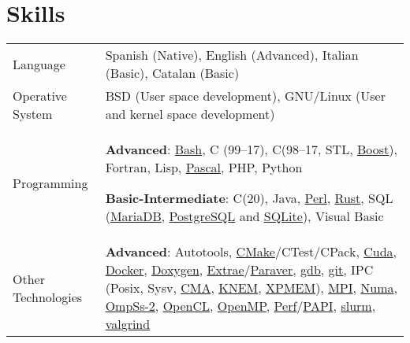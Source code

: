\documentclass[a4paper,11pt]{article}
\def\CC{{C\nolinebreak[4]\hspace{-.05em}\raisebox{.2ex}{++}}}
\begin{document}
\section{Skills}
\begin{tabularx}{\linewidth}{@{}l X@{}}
  Language & Spanish (Native), English (Advanced), Italian (Basic), Catalan (Basic)\\
  Operative System & BSD (User space development), GNU/Linux (User and kernel space development) \\
  Programming & \textbf{Advanced}: \href{https://www.gnu.org/software/bash/}{Bash},
                C (99--17), \CC (98--17, STL, \href{https://www.boost.org/}{Boost}), Fortran, Lisp,
                \href{https://www.freepascal.org/}{Pascal}, PHP, Python

                \textbf{Basic-Intermediate}: \CC (20), Java,
                \href{https://www.perl.org/}{Perl},
                \href{https://www.rust-lang.org/}{Rust},
                SQL (\href{https://mariadb.org/}{MariaDB},
                \href{https://www.postgresql.org/}{PostgreSQL} and
                \href{https://www.sqlite.org/index.html}{SQLite}), Visual Basic  \\

  Other Technologies & \textbf{Advanced}:
                       Autotools,
                       \href{https://cmake.org/}{CMake}/CTest/CPack,
                       \href{https://developer.nvidia.com/cuda-zone}{Cuda},
                       \href{https://www.docker.com/}{Docker},
                       \href{https://doxygen.nl/}{Doxygen},
                       \href{https://tools.bsc.es/extrae}{Extrae}/\href{https://tools.bsc.es/paraver}{Paraver},
                       \href{https://www.sourceware.org/gdb/}{gdb},
                       \href{https://git-scm.com/}{git},
                       IPC (Posix, Sysv,
                       \href{https://lwn.net/Articles/405284/}{CMA},
                       \href{https://knem.gitlabpages.inria.fr/}{KNEM},
                       \href{https://github.com/hpc/xpmem}{XPMEM}),
                       \href{https://www.mpi-forum.org/}{MPI},
                       \href{https://www.kernel.org/doc/html/v4.19/vm/numa.html}{Numa},
                       \href{https://pm.bsc.es/ompss-2}{OmpSs-2},
                       \href{https://www.khronos.org/api/opencl}{OpenCL},
                       \href{https://www.openmp.org/}{OpenMP},
                       \href{https://perf.wiki.kernel.org/index.php/Main_Page}{Perf}/\href{https://icl.utk.edu/papi/}{PAPI},
                       \href{https://slurm.schedmd.com/}{slurm},
                       \href{https://valgrind.org/}{valgrind}


\end{tabularx}
\end{document}
